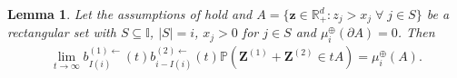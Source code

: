 \documentclass[10pt,a4paper]{amsart}
\newtheorem{lemma}{Lemma}
\newcommand{\E}{\mathbb{E}}
\def\MRV{\mathcal{MRV}}
\renewcommand\P{\mathbb{P}}
\newcommand{\R}{\mathbb{R}}
\def\bZ{\boldsymbol Z}
\newcommand{\beam}{\begin{eqnarray}}
\def\bz{\boldsymbol z}
\newcommand{\eeam}{\end{eqnarray}\noindent}
\begin{document}
\begin{lemma} \label{Lemma 3.4}
Let the assumptions of  hold and
%
 $A= \{\bz \in \R_+^d: z_j>x_j \;\forall\; j\in S\}$ be a rectangular set with
 $S\subseteq \mathbb{I}$, $|S|= i$, $x_{j}>0$ for $j\in S$ and $\mu_i^{\oplus}(\partial A)=0$. Then
\beam\label{eq:lemma2}
   \lim_{t\to\infty}b_{I(i)}^{(1)\leftarrow}(t)b_{i-I(i)}^{(2)\leftarrow}(t) \P\left(\bZ^{(1)}+\bZ^{(2)}\in tA\right)
        =\mu_i^{\oplus}(A).
\eeam
\end{lemma}
\end{document}
